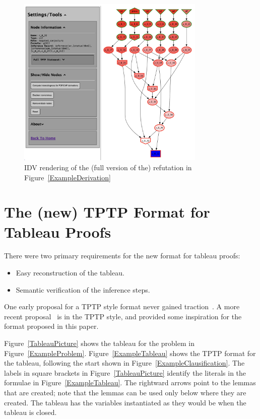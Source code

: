 \documentclass[runningheads]{llncs}
\begin{document}
\begin{figure}[htb]
\centering
\includegraphics[width=0.8\textwidth]{PaperFOFIDV.pdf}
\vspace*{-1em}
\caption{IDV rendering of the (full version of the) refutation in Figure~\ref{ExampleDerivation}}
\label{Refutation}
\end{figure}

\section{The (new) TPTP Format for Tableau Proofs}
\label{Tableau}

There were two primary requirements for the new format for tableau proofs:
\begin{itemize}
\item Easy reconstruction of the tableau.
\item Semantic verification of the inference steps.
\end{itemize}
One early proposal for a TPTP style format never gained traction~\cite{OS10}.
A more recent proposal~\cite{OH23} is in the TPTP style, and provided some inspiration for
the format proposed in this paper.

Figure~\ref{TableauPicture} shows the tableau for the problem in Figure~\ref{ExampleProblem}.
Figure~\ref{ExampleTableau} shows the TPTP format for the tableau, following the start shown in 
Figure~\ref{ExampleClausification}.
The labels in square brackets in Figure~\ref{TableauPicture} identify the literals in the 
formulae in Figure~\ref{ExampleTableau}.
The rightward arrows point to the lemmas that are created; note that the lemmas can be used
only below where they are created.
The tableau has the variables instantiated as they would be when the tableau is closed.
\end{document}
